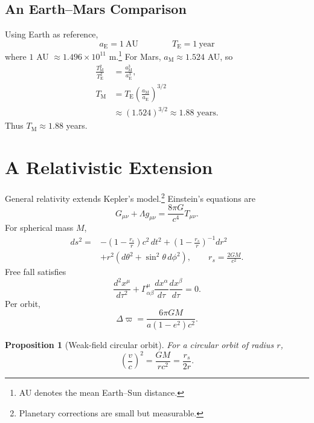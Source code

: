 \documentclass[11pt]{article}
\newtheorem{proposition}{Proposition}[section]
\begin{document}
\subsection{An Earth--Mars Comparison}
Using Earth as reference,
\[
    a_{\mathrm{E}} = 1\ \text{AU} \qquad\qquad T_{\mathrm{E}} = 1\ \text{year}
\]
where $1$ AU $\approx 1.496 \times 10^{11}$ m.\footnote{AU denotes the mean
Earth--Sun distance.} For Mars, $a_{\mathrm{M}} \approx 1.524$ AU, so
\begin{align*}
    \frac{T_{\mathrm{M}}^2}{T_{\mathrm{E}}^2}
        &= \frac{a_{\mathrm{M}}^3}{a_{\mathrm{E}}^3}, \\
    T_{\mathrm{M}}
        &= T_{\mathrm{E}}\left(\frac{a_{\mathrm{M}}}{a_{\mathrm{E}}}\right)^{3/2} \\
        &\approx (1.524)^{3/2} \approx 1.88 \text{ years.}
\end{align*}
Thus $T_{\mathrm{M}} \approx 1.88$ years.

\section{A Relativistic Extension}
General relativity extends Kepler's model.\footnote{Planetary corrections are
small but measurable.} Einstein's equations are
\begin{equation}
    G_{\mu\nu} + \Lambda g_{\mu\nu} = \frac{8\pi G}{c^4} T_{\mu\nu}.
\end{equation}
For spherical mass $M$,
\begin{equation}
    \begin{split}
        ds^2 = {}&-\left(1 - \frac{r_s}{r}\right)c^2\,dt^2
                 + \left(1 - \frac{r_s}{r}\right)^{-1} dr^2 \\
                 &+ r^2\left(d\theta^2 + \sin^2\theta\, d\phi^2\right),
                 \qquad r_s = \frac{2GM}{c^2}.
    \end{split}
\end{equation}
Free fall satisfies
\begin{equation}
    \frac{d^2 x^\mu}{d\tau^2}
        + \Gamma^\mu_{\alpha\beta}\frac{dx^\alpha}{d\tau}\frac{dx^\beta}{d\tau} = 0.
\end{equation}
Per orbit,
\begin{equation}
    \Delta\varpi = \frac{6\pi GM}{a(1-e^2)c^2}.
\end{equation}

\begin{proposition}[Weak-field circular orbit]\label{prop:weak}
For a circular orbit of radius $r$,
\begin{equation}
    \left(\frac{v}{c}\right)^2 = \frac{GM}{rc^2} = \frac{r_s}{2r}.
\end{equation}
\end{proposition}
\end{document}
